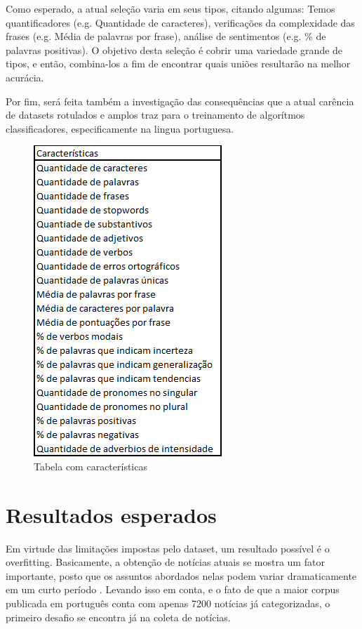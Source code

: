 \documentclass[conference]{IEEEtran}
\begin{document}
Como esperado, a atual seleção varia em seus tipos, citando algumas: Temos quantificadores (e.g. Quantidade de caracteres), verificações da complexidade das frases (e.g. Média de palavras por frase), análise de sentimentos (e.g. \% de palavras positivas). O objetivo desta seleção é cobrir uma variedade grande de tipos, e então, combina-los a fim de encontrar quais uniões resultarão na melhor acurácia.

Por fim, será feita também a investigação das consequências que a atual carência de datasets rotulados e amplos traz para o treinamento de algorítmos classificadores, especificamente na lingua portuguesa.

\begin{figure}[htbp]
\centerline{\includegraphics[scale=0.5]{tabela1.png}}
\caption{Tabela com características}
\label{fig}
\end{figure}

\section{Resultados esperados}
Em virtude das limitações impostas pelo dataset, um resultado possível é o overfitting. Basicamente, a obtenção de notícias atuais se mostra um fator importante, posto que os assuntos abordados nelas podem variar dramaticamente em um curto período \cite{b7}. Levando isso em conta, e o fato de que a maior corpus publicada em português conta com apenas 7200 notícias já categorizadas, o primeiro desafio se encontra já na coleta de notícias.
\end{document}
